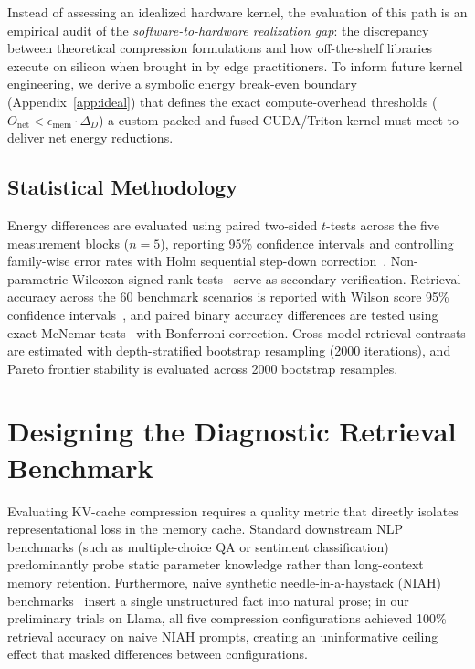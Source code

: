 \documentclass[sigconf,nonacm]{acmart}
\begin{document}
Instead of assessing an idealized hardware kernel, the evaluation of this path is an empirical audit of the \emph{software-to-hardware realization gap}: the discrepancy between theoretical compression formulations and how off-the-shelf libraries execute on silicon when brought in by edge practitioners. To inform future kernel engineering, we derive a symbolic energy break-even boundary (Appendix~\ref{app:ideal}) that defines the exact compute-overhead thresholds ($O_\text{net} < \epsilon_\text{mem} \cdot \Delta_D$) a custom packed and fused CUDA/Triton kernel must meet to deliver net energy reductions.

\subsection{Statistical Methodology}

Energy differences are evaluated using paired two-sided $t$-tests across the five measurement blocks ($n=5$), reporting 95\% confidence intervals and controlling family-wise error rates with Holm sequential step-down correction~\cite{holm1979simple}. Non-parametric Wilcoxon signed-rank tests~\cite{wilcoxon1945individual} serve as secondary verification. Retrieval accuracy across the 60 benchmark scenarios is reported with Wilson score 95\% confidence intervals~\cite{wilson1927probable}, and paired binary accuracy differences are tested using exact McNemar tests~\cite{mcnemar1947note} with Bonferroni correction. Cross-model retrieval contrasts are estimated with depth-stratified bootstrap resampling (2000 iterations), and Pareto frontier stability is evaluated across 2000 bootstrap resamples.


\section{Designing the Diagnostic Retrieval Benchmark}
\label{sec:benchmark}

Evaluating KV-cache compression requires a quality metric that directly isolates representational loss in the memory cache. Standard downstream NLP benchmarks (such as multiple-choice QA or sentiment classification) predominantly probe static parameter knowledge rather than long-context memory retention. Furthermore, naive synthetic needle-in-a-haystack (NIAH) benchmarks~\cite{kamradt2023needle} insert a single unstructured fact into natural prose; in our preliminary trials on Llama, all five compression configurations achieved 100\% retrieval accuracy on naive NIAH prompts, creating an uninformative ceiling effect that masked differences between configurations.
\end{document}

